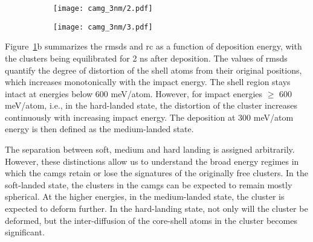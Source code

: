 \begin{changebar}
\begin{figure}[!h]
	\centering
	\begin{subfigure}{0.5\textwidth}
		\texttt{[image: camg\_3nm/2.pdf]}
	\end{subfigure}%
	\hfill
	\begin{subfigure}{0.5\textwidth}
		\texttt{[image: camg\_3nm/3.pdf]}
	\end{subfigure}
	\label{f:clus_single3}
\end{figure}

Figure~\ref{f:clus_single3}b summarizes the \gls{rmsds} and \gls{rc} as a function of deposition energy, with the clusters being equilibrated for 2 ns after deposition. The values of \gls{rmsds} quantify the degree of distortion of the shell atoms from their original positions, which increases monotonically with the impact energy. The shell region stays intact at energies below 600 meV/atom. However, for impact energies $\geq$ 600 meV/atom, i.e., in the hard-landed state, the distortion of the cluster increases continuously with increasing impact energy. The deposition at 300 meV/atom energy is then defined as the medium-landed state. \par The separation between soft, medium and hard landing is assigned arbitrarily. However, these distinctions allow us to understand the broad energy regimes in which the \gls{camg}s retain or lose the signatures of the originally free clusters. In the soft-landed state, the clusters in the \gls{camg}s can be expected to remain mostly spherical. At the higher energies, in the medium-landed state, the cluster is expected to deform further. In the hard-landing state, not only will the cluster be deformed, but the inter-diffusion of the core-shell atoms in the cluster becomes significant. \par


\end{changebar}
